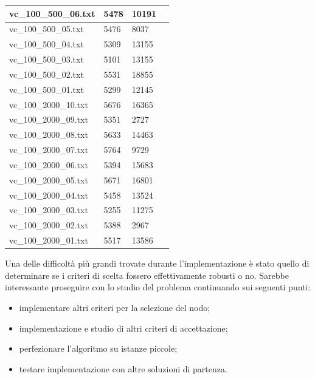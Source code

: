\documentclass[11pt]{article}
\begin{document}
\begin{table}[!ht]
\begin{tabular}{|l|l|l|l|}
        vc\_100\_500\_06.txt & 5478 & 10191 \\ \hline
        vc\_100\_500\_05.txt & 5476 & 8037 \\ \hline
        vc\_100\_500\_04.txt & 5309 & 13155 \\ \hline
        vc\_100\_500\_03.txt & 5101 & 13155 \\ \hline
        vc\_100\_500\_02.txt & 5531 & 18855 \\ \hline
        vc\_100\_500\_01.txt & 5299 & 12145 \\ \hline
        vc\_100\_2000\_10.txt & 5676 & 16365 \\ \hline
        vc\_100\_2000\_09.txt & 5351 & 2727 \\ \hline
        vc\_100\_2000\_08.txt & 5633 & 14463 \\ \hline
        vc\_100\_2000\_07.txt & 5764 & 9729 \\ \hline
        vc\_100\_2000\_06.txt & 5394 & 15683 \\ \hline
        vc\_100\_2000\_05.txt & 5671 & 16801 \\ \hline
        vc\_100\_2000\_04.txt & 5458 & 13524 \\ \hline
        vc\_100\_2000\_03.txt & 5255 & 11275 \\ \hline
        vc\_100\_2000\_02.txt & 5388 & 2967 \\ \hline
        vc\_100\_2000\_01.txt & 5517 & 13586 \\ \hline

    \end{tabular}
\end{table}

\pagebreak

Una delle difficoltà più grandi trovate durante l'implementazione è stato quello di determinare se i criteri di scelta fossero effettivamente robusti o no. Sarebbe interessante proseguire con lo studio del problema continuando sui seguenti punti:

\begin{itemize}
    \item{implementare altri criteri per la selezione del nodo;}
    \item{implementazione e studio di altri criteri di accettazione;}
    \item{perfezionare l'algoritmo su istanze piccole;}
    \item{testare implementazione con altre soluzioni di partenza.}
\end{itemize}
\end{document}
